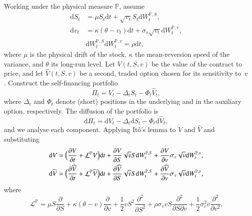 \documentclass[12pt]{report} %
\theoremstyle{plain} %
\theoremstyle{definition} %
\theoremstyle{remark} %
\begin{document}
Working under the physical measure $\mathbb P$, assume
\begin{equation}\label{eq:heston_phys}
\begin{aligned}
\mathrm dS_t &= \mu S_t \mathrm dt + \sqrt{v_t}S_t\mathrm dW_t^{\mathbb P,S},\\
\mathrm dv_t &= \kappa(\theta - v_t)\mathrm dt + \sigma_v\sqrt{v_t}\mathrm dW_t^{\mathbb P,v},\\
&\mathrm dW_t^{\mathbb P,S}\mathrm dW_t^{\mathbb P,v} = \rho\mathrm dt,
\end{aligned}
\end{equation}
where $\mu$ is the physical drift of the stock, $\kappa$ the mean-reversion speed of the
variance, and $\theta$ its long-run level. Let $V(t,S,v)$ be the value of the contract to price,
and let $\widehat V(t,S,v)$ be a second, traded option chosen for its sensitivity to~$v$.
Construct the self-financing portfolio
\begin{equation}\label{eq:heston_portfolio}
\Pi_t = V_t - \Delta_t S_t - \Phi_t \widehat V_t ,
\end{equation}
where $\Delta_t$ and $\Phi_t$ denote (short) positions in the underlying and in the auxiliary
option, respectively. The diffusion of the portfolio is
\begin{equation}\label{eq:heston_portfolio_diffusion}
\mathrm d\Pi_t = \mathrm dV_t - \Delta_t \mathrm dS_t - \Phi_t \mathrm d\widehat V_t,
\end{equation}
and we analyse each component. Applying Itô's lemma to $V$ and $\widehat V$ and substituting
\begin{equation}\label{eq:heston_dVs}
\begin{aligned}
\mathrm dV &= \Bigl(\frac{\partial V}{\partial t} + \mathcal L^{\mathbb P}V\Bigr)\mathrm dt
 + \frac{\partial V}{\partial S}\sqrt{v}S\mathrm dW_t^{\mathbb P,S}
 + \frac{\partial V}{\partial v}\sigma_v\sqrt{v}\mathrm dW_t^{\mathbb P,v},\\
\mathrm d\widehat V &= \Bigl(\frac{\partial \widehat V}{\partial t} + \mathcal L^{\mathbb P}\widehat V\Bigr)\mathrm dt
 + \frac{\partial \widehat V}{\partial S}\sqrt{v}S\mathrm dW_t^{\mathbb P,S}
 + \frac{\partial \widehat V}{\partial v}\sigma_v\sqrt{v}\mathrm dW_t^{\mathbb P,v},
\end{aligned}
\end{equation}
where
\[
\mathcal L^{\mathbb P}
 = \mu S\frac{\partial}{\partial S}
 + \kappa(\theta - v)\frac{\partial}{\partial v}
 + \frac{1}{2} v S^{2}\frac{\partial^{2}}{\partial S^{2}}
 + \rho\sigma_v v S\frac{\partial^{2}}{\partial S\partial v}
 + \frac{1}{2}\sigma_v^{2} v \frac{\partial^{2}}{\partial v^{2}}.
\]
\end{document}
